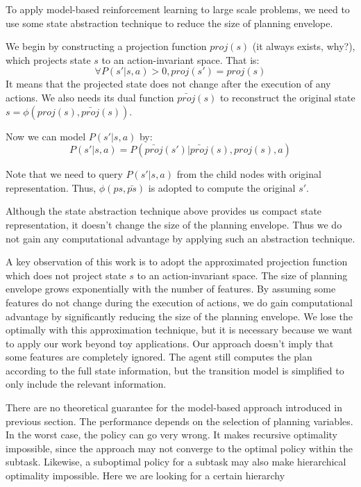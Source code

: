 \documentclass{article} %
\begin{document}
To apply model-based reinforcement learning to large scale problems, 
we need to use some state abstraction technique to reduce the size of planning envelope.

We begin by constructing a projection function $proj(s)$ (it always exists, why?),
which projects state $s$ to an action-invariant space.
That is:
\begin{equation}
    \forall P(s'|s, a) > 0, proj(s') = proj(s)
\end{equation}
It means that the projected state does not change after the execution of 
any actions.
We also needs its dual function $\bar{proj}(s)$ to reconstruct 
the original state $s = \phi(proj(s), \bar{proj}(s))$.

Now we can model $P(s'|s, a)$ by:
\begin{equation}
    P(s'|s, a) = P(\bar{proj}(s')| \bar{proj}(s), proj(s), a)
\end{equation}

Note that we need to query $P(s'|s, a)$ from the child nodes with original representation.
Thus, $\phi(ps, \bar{ps})$ is adopted to compute the original $s'$.  

Although the state abstraction technique above provides us compact state representation, 
it doesn't change the size of the planning envelope. Thus we do not gain any computational
advantage by applying such an abstraction technique.

A key observation of this work is to adopt the approximated projection function which
does not project state $s$ to an action-invariant space.
The size of planning envelope grows exponentially with the number of features.
By assuming 
some features do not change during the execution of actions, we do gain computational advantage by
significantly reducing the size of the planning envelope. 
We lose the optimally with this approximation technique, but it is necessary because we want 
to apply our work beyond toy applications.
Our approach doesn't imply that
some features are completely ignored. The agent still computes the plan according to 
the full state information, but the transition model is simplified to only include the 
relevant information.

There are no theoretical guarantee for the model-based approach introduced in previous 
section. The performance depends on the selection of planning variables. In the worst
case, the policy can go very wrong. It makes recursive optimality impossible, since
the approach may not converge to the optimal policy within the subtask. Likewise,
a suboptimal policy for a subtask may also make hierarchical optimality impossible.
Here we are looking for a certain hierarchy  
\end{document}
